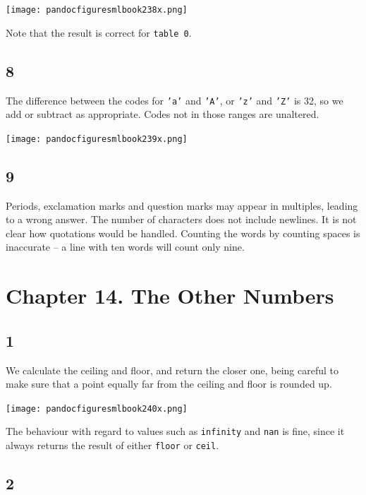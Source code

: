 \documentclass[]{book}
\begin{document}
\medskip
\begin{center}
\noindent\texttt{[image: pandocfiguresmlbook238x.png]}
\end{center}
\medskip

\noindent Note that the result is correct for \texttt{table 0}.

\subsection*{8}

The difference between the codes for \texttt{'a'} and \texttt{'A'}, or \texttt{'z'} and \texttt{'Z'} is 32, so we add or subtract as appropriate. Codes not in those ranges are unaltered.

\medskip
\begin{center}
\noindent\texttt{[image: pandocfiguresmlbook239x.png]}
\end{center}
\medskip

\subsection*{9}
Periods, exclamation marks and question marks may appear in multiples, leading to a wrong answer. The number of characters does not include newlines. It is not clear how quotations would be handled. Counting the words by counting spaces is inaccurate -- a line with ten words will count only nine.

\section*{Chapter 14. The Other Numbers}
\subsection*{1}

We calculate the ceiling and floor, and return the closer one, being careful to make sure that a point equally far from the ceiling and floor is rounded up.

\medskip
\begin{center}
\noindent\texttt{[image: pandocfiguresmlbook240x.png]}
\end{center}
\medskip

\noindent The behaviour with regard to values such as \texttt{infinity} and \texttt{nan} is fine, since it always returns the result of either \texttt{floor} or \texttt{ceil}.

\subsection*{2}
\end{document}
